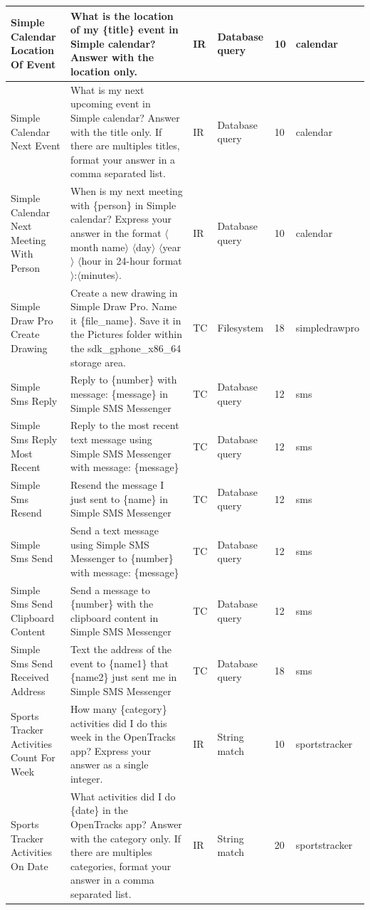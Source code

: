 \documentclass{article}
\begin{document}
\begin{appendices}
\begin{longtable}{>{\RaggedRight\seqsplit}p{.8in}p{2in}p{.3in}p{.5in}p{.3in}p{.5in}}
\midrule
Simple Calendar Location Of Event & What is the location of my \{title\} event in Simple calendar? Answer with the location only. & IR & Database query & 10 & calendar \\
\midrule
Simple Calendar Next Event & What is my next upcoming event in Simple calendar? Answer with the title only. If there are multiples titles, format your answer in a comma separated list. & IR & Database query & 10 & calendar \\
\midrule
Simple Calendar Next Meeting With Person & When is my next meeting with \{person\} in Simple calendar? Express your answer in the format $\langle$month name$\rangle$ $\langle$day$\rangle$ $\langle$year$\rangle$ $\langle$hour in 24-hour format$\rangle$:$\langle$minutes$\rangle$. & IR & Database query & 10 & calendar \\
\midrule
Simple Draw Pro Create Drawing & Create a new drawing in Simple Draw Pro. Name it \{file\_name\}. Save it in the Pictures folder within the sdk\_gphone\_x86\_64 storage area. & TC & Filesystem & 18 & simpledrawpro \\
\midrule
Simple Sms Reply & Reply to \{number\} with message: \{message\} in Simple SMS Messenger & TC & Database query & 12 & sms \\
\midrule
Simple Sms Reply Most Recent & Reply to the most recent text message using Simple SMS Messenger with message: \{message\} & TC & Database query & 12 & sms \\
\midrule
Simple Sms Resend & Resend the message I just sent to \{name\} in Simple SMS Messenger & TC & Database query & 12 & sms \\
\midrule
Simple Sms Send & Send a text message using Simple SMS Messenger to \{number\} with message: \{message\} & TC & Database query & 12 & sms \\
\midrule
Simple Sms Send Clipboard Content & Send a message to \{number\} with the clipboard content in Simple SMS Messenger & TC & Database query & 12 & sms \\
\midrule
Simple Sms Send Received Address & Text the address of the event to \{name1\} that \{name2\} just sent me in Simple SMS Messenger & TC & Database query & 18 & sms \\
\midrule
Sports Tracker Activities Count For Week & How many \{category\} activities did I do this week in the OpenTracks app? Express your answer as a single integer. & IR & String match & 10 & sportstracker \\
\midrule
Sports Tracker Activities On Date & What activities did I do \{date\} in the OpenTracks app? Answer with the category only. If there are multiples categories, format your answer in a comma separated list. & IR & String match & 20 & sportstracker \\

\end{longtable}
\end{appendices}
\end{document}
